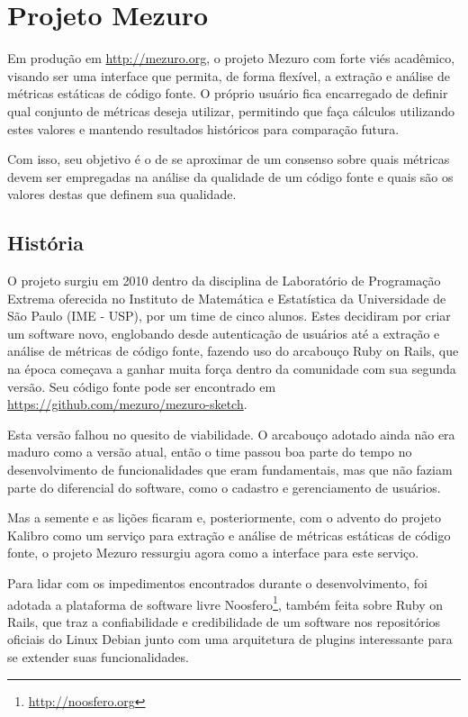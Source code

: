 \documentclass[12pt]{article}
\begin{document}
\section{Projeto Mezuro} \label{sec:projeto-mezuro}
Em produção em \url{http://mezuro.org}, o projeto Mezuro com forte viés acadêmico, visando ser uma interface que permita, de forma flexível, a extração e análise de métricas estáticas de código fonte. O próprio usuário fica encarregado de definir qual conjunto de métricas deseja utilizar, permitindo que faça cálculos utilizando estes valores e mantendo resultados históricos para comparação futura.

Com isso, seu objetivo é o de se aproximar de um consenso sobre quais métricas devem ser empregadas na análise da qualidade de um código fonte e quais são os valores destas que definem sua qualidade.

  \subsection{História} \label{subsec:historia}
  O projeto surgiu em 2010 dentro da disciplina de Laboratório de Programação Extrema oferecida no Instituto de Matemática e Estatística da Universidade de São Paulo (IME - USP), por um time de cinco alunos. Estes decidiram por criar um software novo, englobando desde autenticação de usuários até a extração e análise de métricas de código fonte, fazendo uso do arcabouço Ruby on Rails, que na época começava a ganhar muita força dentro da comunidade com sua segunda versão. Seu código fonte pode ser encontrado em \url{https://github.com/mezuro/mezuro-sketch}.

  Esta versão falhou no quesito de viabilidade. O arcabouço adotado ainda não era maduro como a versão atual, então o time passou boa parte do tempo no desenvolvimento de funcionalidades que eram fundamentais, mas que não faziam parte do diferencial do software, como o cadastro e gerenciamento de usuários.

  Mas a semente e as lições ficaram e, posteriormente, com o advento do projeto Kalibro \cite{of13} como um serviço para extração e análise de métricas estáticas de código fonte, o projeto Mezuro ressurgiu agora como a interface para este serviço.

  Para lidar com os impedimentos encontrados durante o desenvolvimento, foi adotada a plataforma de software livre Noosfero\footnote{\url{http://noosfero.org}}, também feita sobre Ruby on Rails, que traz a confiabilidade e credibilidade de um software nos repositórios oficiais do Linux Debian junto com uma arquitetura de plugins interessante para se extender suas funcionalidades.
\end{document}

